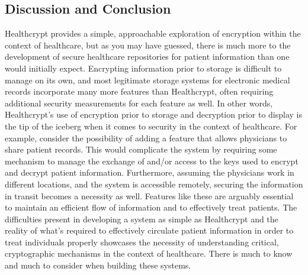 \documentclass[letterpaper, 10pt,DIV=13]{scrartcl}
\begin{document}
\begin{multicols}{2}
\section*{Discussion and Conclusion}
\begin{spacing}{1.25}
Healthcrypt provides a simple, approachable exploration of encryption within the context of healthcare, but as you may have guessed, there is much more to the development of secure healthcare repositories for patient information than one would initially expect. Encrypting information prior to storage is difficult to manage on its own, and most legitimate storage systems for electronic medical records incorporate many more features than Healthcrypt, often requiring additional security measurements for each feature as well. In other words, Healthcrypt's use of encryption prior to storage and decryption prior to display is the tip of the iceberg when it comes to security in the context of healthcare. For example, consider the possibility of adding a feature that allows physicians to share patient records. This would complicate the system by requiring some mechanism to manage the exchange of and/or access to the keys used to encrypt and decrypt patient information. Furthermore, assuming the physicians work in different locations, and the system is accessible remotely, securing the information in transit becomes a necessity as well. Features like these are arguably essential to maintain an efficient flow of information and to effectively treat patients. The difficulties present in developing a system as simple as Healthcrypt and the reality of what's required to effectively circulate patient information in order to treat individuals properly showcases the necessity of understanding critical, cryptographic mechanisms in the context of healthcare. There is much to know and much to consider when building these systems.
\end{spacing}

\vspace{-2.5pt}




\end{multicols}
\end{document}
